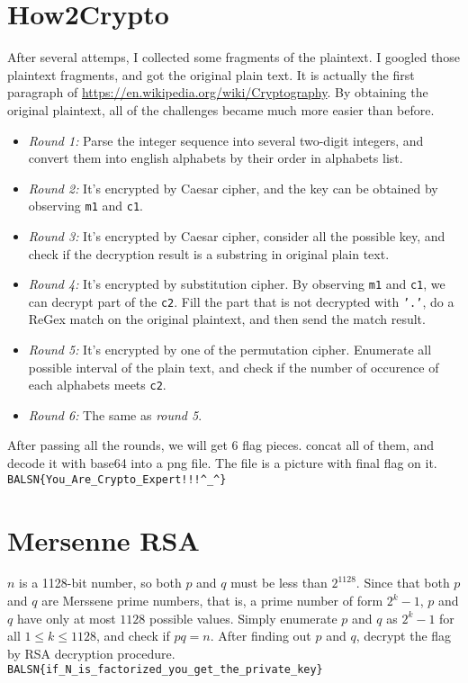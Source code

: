 \documentclass[12pt,a4paper]{article}
\begin{document}
\section{How2Crypto}
    After several attemps, I collected some fragments of the plaintext. I googled those plaintext fragments, and got the original plain text. It is actually the first paragraph of \url{https://en.wikipedia.org/wiki/Cryptography}. By obtaining the original plaintext, all of the challenges became much more easier than before.
    \begin{itemize}
    \item\textit{Round 1:} Parse the integer sequence into several two-digit integers, and convert them into english alphabets by their order in alphabets list.
    \item\textit{Round 2:} It's encrypted by Caesar cipher, and the key can be obtained by observing \texttt{m1} and \texttt{c1}.
    \item\textit{Round 3:} It's encrypted by Caesar cipher, consider all the possible key, and check if the decryption result is a substring in original plain text.
    \item\textit{Round 4:} It's encrypted by substitution cipher. By observing \texttt{m1} and \texttt{c1}, we can decrypt part of the \texttt{c2}. Fill the part that is not decrypted with \texttt{'.'}, do a ReGex match on the original plaintext, and then send the match result.
    \item\textit{Round 5:} It's encrypted by one of the permutation cipher. Enumerate all possible interval of the plain text, and check if the number of occurence of each alphabets meets \texttt{c2}.
    \item\textit{Round 6:} The same as \textit{round 5}.
    \end{itemize}
    After passing all the rounds, we will get 6 flag pieces. concat all of them, and decode it with base64 into a png file. The file is a picture with final flag on it.\\
\texttt{BALSN\{You\_Are\_Crypto\_Expert!!!\^{}\_\^{}\}}

\section{Mersenne RSA}
    $n$ is a 1128-bit number, so both $p$ and $q$ must be less than $2^1128$. Since that both $p$ and $q$ are Merssene prime numbers, that is, a prime number of form $2^k-1$, $p$ and $q$ have only at most $1128$ possible values. Simply enumerate $p$ and $q$ as  $2^k-1$ for all $1\leq k\leq 1128$, and check if $pq=n$. After finding out $p$ and $q$, decrypt the flag by RSA decryption procedure.\\
\texttt{BALSN\{if\_N\_is\_factorized\_you\_get\_the\_private\_key\}}
\end{document}
